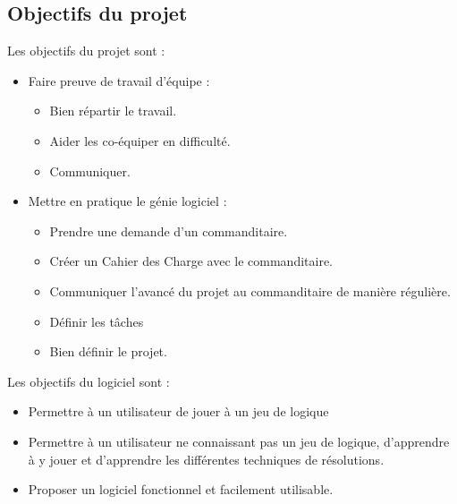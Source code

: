 \subsection{Objectifs du projet}
Les objectifs du projet sont :
\begin{itemize}
	\item Faire preuve de travail d'équipe :
		\begin{itemize}
			\item Bien répartir le travail.
			\item Aider les co-équiper en difficulté.
			\item Communiquer.
		\end{itemize}
	\item Mettre en pratique le génie logiciel :
		\begin{itemize}
			\item Prendre une demande d'un commanditaire.
			\item Créer un Cahier des Charge avec le commanditaire.
			\item Communiquer l'avancé du projet au commanditaire de manière régulière.
			\item Définir les tâches
			\item Bien définir le projet.
		\end{itemize}
\end{itemize}

Les objectifs du logiciel sont :
\begin{itemize}
	\item Permettre à un utilisateur de jouer à un jeu de logique
	\item Permettre à un utilisateur ne connaissant pas un jeu de logique, d'apprendre à y jouer et d'apprendre les différentes techniques de résolutions.
	\item Proposer un logiciel fonctionnel et facilement utilisable.
\end{itemize}

